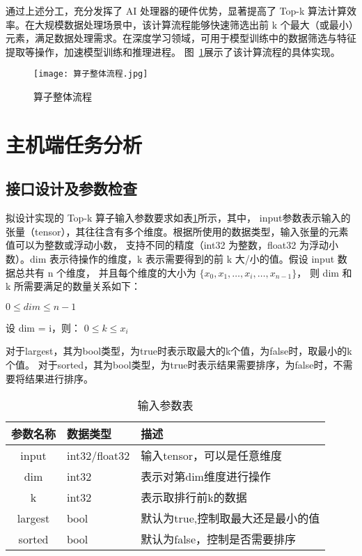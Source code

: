 通过上述分工，充分发挥了 AI 处理器的硬件优势，显著提高了 Top-k 算法计算效率。在大规模数据处理场景中，该计算流程能够快速筛选出前 k 个最大（或最小）元素，满足数据处理需求。在深度学习领域，可用于模型训练中的数据筛选与特征提取等操作，加速模型训练和推理进程。
图~\ref{fig:topk}展示了该计算流程的具体实现。
\begin{figure}[ht]
    \centering
    \texttt{[image: 算子整体流程.jpg]}
    \caption{算子整体流程}
    \label{fig:topk}
\end{figure}




\section{主机端任务分析}
    \subsection{接口设计及参数检查}
    拟设计实现的 Top-k 算子输入参数要求如表\ref{tab:input_tab}所示，其中，
    input参数表示输入的张量（tensor），其往往含有多个维度。根据所使用的数据类型，输入张量的元素值可以为整数或浮动小数，
    支持不同的精度（int32 为整数，float32 为浮动小数）。dim 表示待操作的维度，k 表示需要得到的前 k 大/小的值。假设 input 数据总共有 n 个维度，
    并且每个维度的大小为 $\{ x_{0}, x_{1}, \dots, x_{i}, \dots, x_{n-1} \}$，
    则 dim 和 k 所需要满足的数量关系如下：

    \begin{center}
        $0 \leq dim \leq n - 1$
        
        设 dim = i，则： $0 \leq k \leq x_{i}$
    \end{center}
    对于largest，其为bool类型，为true时表示取最大的k个值，为false时，取最小的k个值。
    对于sorted，其为bool类型，为true时表示结果需要排序，为false时，不需要将结果进行排序。
    \begin{table}
        \centering
        \caption{输入参数表}
        \label{tab:input_tab}
        \begin{tabular}{cll} %
          \toprule
          参数名称   & 数据类型                                       & 描述                          \\
          \midrule
          input & int32/float32 & 输入tensor，可以是任意维度                      \\
          dim & int32   & 表示对第dim维度进行操作            \\
          k   & int32   & 表示取排行前k的数据              \\
          largest & bool   & 默认为true,控制取最大还是最小的值            \\
          sorted & bool   & 默认为false，控制是否需要排序            \\
          
          \bottomrule
        \end{tabular}
    \end{table}

